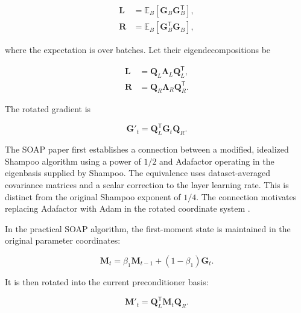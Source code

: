 \begin{align}
    \mathbf{L}
    &=
    \mathbb{E}_{B}
    [\mathbf{G}_{B}\mathbf{G}_{B}^{\mathsf{T}}],
    \label{eq:opt-soap-L}\\
    \mathbf{R}
    &=
    \mathbb{E}_{B}
    [\mathbf{G}_{B}^{\mathsf{T}}\mathbf{G}_{B}],
    \label{eq:opt-soap-R}
\end{align}

where the expectation is over batches. Let their eigendecompositions be

\begin{align}
    \mathbf{L}
    &=
    \mathbf{Q}_{L}\boldsymbol{\Lambda}_{L}
    \mathbf{Q}_{L}^{\mathsf{T}},
    \label{eq:opt-soap-left-eigen}\\
    \mathbf{R}
    &=
    \mathbf{Q}_{R}\boldsymbol{\Lambda}_{R}
    \mathbf{Q}_{R}^{\mathsf{T}}.
    \label{eq:opt-soap-right-eigen}
\end{align}

The rotated gradient is

\begin{equation}
    \mathbf{G}'_t
    =
    \mathbf{Q}_{L}^{\mathsf{T}}
    \mathbf{G}_t
    \mathbf{Q}_{R}.
    \label{eq:opt-soap-rotated-gradient}
\end{equation}

The SOAP paper first establishes a connection between a modified,
idealized Shampoo algorithm using a power of $1/2$ and Adafactor
operating in the eigenbasis supplied by Shampoo. The equivalence
uses dataset-averaged covariance matrices and a scalar correction
to the layer learning rate. This is distinct from the original
Shampoo exponent of $1/4$. The connection motivates replacing
Adafactor with Adam in the rotated coordinate system
\parencite{Vyas2025SOAP}.

In the practical SOAP algorithm, the first-moment state is maintained
in the original parameter coordinates:

\begin{equation}
    \mathbf{M}_t
    =
    \beta_1\mathbf{M}_{t-1}
    +(1-\beta_1)\mathbf{G}_t.
    \label{eq:opt-soap-first-moment}
\end{equation}

It is then rotated into the current preconditioner basis:

\begin{equation}
    \mathbf{M}'_t
    =
    \mathbf{Q}_{L}^{\mathsf{T}}
    \mathbf{M}_t
    \mathbf{Q}_{R}.
    \label{eq:opt-soap-rotated-momentum}
\end{equation}

